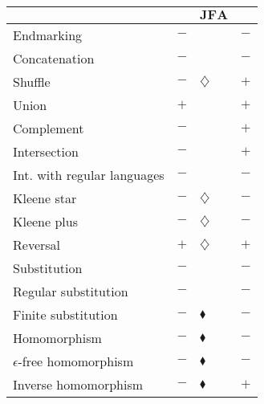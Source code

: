 \documentclass{ws-ijmpc}
\providecommand{\tabularnewline}{\\}
\begin{document}
\begin{center}
\begin{tabular}{|l|>{\raggedleft}p{10mm}>{\centering}p{3mm}|>{\centering}p{17mm}|}
\cline{2-4} 
\multicolumn{1}{l|}{} & \multicolumn{2}{c|}{$\mathbf{GJFA}$} & $\mathbf{JFA}$\tabularnewline
\hline 
Endmarking & $-$ &  & $-$\tabularnewline
\hline 
Concatenation & $-$ &  & $-$\tabularnewline
\hline 
Shuffle & $-$ & $\diamondsuit$ & $+$\tabularnewline
\hline 
Union & $+$ &  & $+$\tabularnewline
\hline 
Complement & $-$ &  & $+$\tabularnewline
\hline 
Intersection & $-$ &  & $+$\tabularnewline
\hline 
Int. with regular languages & $-$ &  & $-$\tabularnewline
\hline 
Kleene star & $-$ & $\diamondsuit$ & $-$\tabularnewline
\hline 
Kleene plus & $-$ & $\diamondsuit$ & $-$\tabularnewline
\hline 
Reversal & $+$ & $\diamondsuit$ & $+$\tabularnewline
\hline 
Substitution & $-$ &  & $-$\tabularnewline
\hline 
Regular substitution & $-$ &  & $-$\tabularnewline
\hline 
Finite substitution & $-$ & $\blacklozenge$ & $-$\tabularnewline
\hline 
Homomorphism & $-$ & $\blacklozenge$ & $-$\tabularnewline
\hline 
$\epsilon$-free homomorphism & $-$ & $\blacklozenge$ & $-$\tabularnewline
\hline 
Inverse homomorphism & $-$ & $\blacklozenge$ & $+$\tabularnewline
\hline 
\end{tabular}\medskip{}

\par\end{center}
\end{document}
